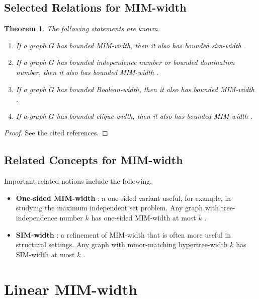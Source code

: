 \documentclass[10pt]{book}
\newtheorem{theorem}{Theorem}[section]
\theoremstyle{definition}
\begin{document}
\subsection{Selected Relations for MIM-width}

\begin{theorem}
The following statements are known.
\begin{enumerate}
    \item If a graph \(G\) has bounded MIM-width, then it also has bounded sim-width \cite{311}.

    \item If a graph \(G\) has bounded independence number or bounded domination number, then it also has bounded MIM-width \cite{311}.

    \item If a graph \(G\) has bounded Boolean-width, then it also has bounded MIM-width \cite{31,32}.

    \item If a graph \(G\) has bounded clique-width, then it also has bounded MIM-width \cite{227}.
\end{enumerate}
\end{theorem}

\begin{proof}
See the cited references.
\end{proof}

\subsection{Related Concepts for MIM-width}
Important related notions include the following.

\begin{itemize}
    \item \textbf{One-sided MIM-width} \cite{33}: a one-sided variant useful, for example, in studying the maximum independent set problem.  
    Any graph with tree-independence number \(k\) has one-sided MIM-width at most \(k\) \cite{33}.

    \item \textbf{SIM-width} \cite{34,322}: a refinement of MIM-width that is often more useful in structural settings.  
    Any graph with minor-matching hypertree-width \(k\) has SIM-width at most \(k\) \cite{33}.
\end{itemize}

\section{Linear MIM-width}
\end{document}
